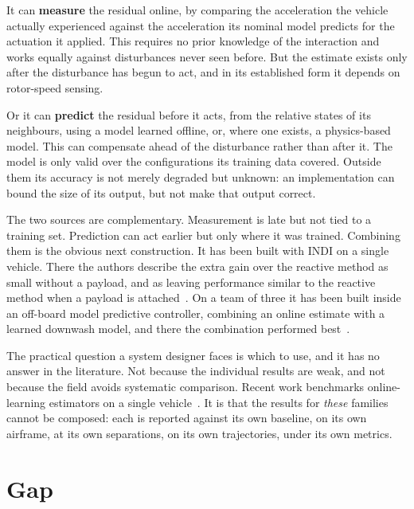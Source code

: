 It can \textbf{measure} the residual online, by comparing the acceleration the vehicle actually
experienced against the acceleration its nominal model predicts for the actuation it applied. This
requires no prior knowledge of the interaction and works equally against disturbances never seen
before. But the estimate exists only after the disturbance has begun to act, and in its established
form it depends on rotor-speed sensing.

Or it can \textbf{predict} the residual before it acts, from the relative states of its neighbours,
using a model learned offline, or, where one exists, a physics-based model. This can compensate
ahead of the disturbance rather than after it.
The model is only valid over the configurations its training data covered. Outside them its
accuracy is not merely degraded but unknown: an implementation can bound the size of its output,
but not make that output correct.

The two sources are complementary. Measurement is late but not tied to a training set. Prediction
can act earlier but only where it was trained. Combining them is the obvious next construction. It
has been built with INDI on a single vehicle. There the authors describe the extra gain over the reactive
method as small without a payload, and as leaving performance similar to the reactive method when a
payload is attached~\cite{cobobriesewitz2026lindi}. On a team of three it has been built inside an
off-board model predictive controller, combining an online estimate with a learned downwash model,
and there the combination performed best~\cite{hsieh2025onlineadaptation}.

The practical question a system designer faces is which to use, and it has no answer in the
literature. Not because the individual results are weak, and not because the field avoids
systematic comparison. Recent work benchmarks online-learning estimators on a single
vehicle~\cite{gu2025comparative}. It is that the results for \emph{these} families cannot be
composed: each is reported against its own baseline, on its own airframe, at its own separations,
on its own trajectories, under its own metrics.

\section{Gap}
\label{sec:intro-gap}

